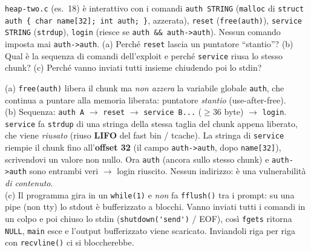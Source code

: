 \question[7]
\lstinline|heap-two.c| (es.\ 18) è interattivo con i comandi \lstinline|auth STRING| (\lstinline|malloc| di \lstinline|struct auth { char name[32]; int auth; }|, azzerata), \lstinline|reset| (\lstinline|free(auth)|), \lstinline|service STRING| (\lstinline|strdup|), \lstinline|login| (riesce se \lstinline|auth && auth->auth|). Nessun comando imposta mai \lstinline|auth->auth|.
(a) Perché \lstinline|reset| lascia un puntatore ``stantio''? (b) Qual è la sequenza di comandi dell'exploit e perché \lstinline|service| riusa lo stesso chunk? (c) Perché vanno inviati tutti insieme chiudendo poi lo stdin?
\begin{solution}
(a) \lstinline|free(auth)| libera il chunk ma \emph{non azzera} la variabile globale \lstinline|auth|, che continua a puntare alla memoria liberata: puntatore \emph{stantio} (use-after-free).\\
(b) Sequenza: \lstinline|auth A| $\to$ \lstinline|reset| $\to$ \lstinline|service B...| ($\ge 36$ byte) $\to$ \lstinline|login|. \lstinline|service| fa \lstinline|strdup| di una stringa della stessa taglia del chunk appena liberato, che viene \emph{riusato} (riuso \textbf{LIFO} del fast bin / tcache). La stringa di \lstinline|service| riempie il chunk fino all'\textbf{offset 32} (il campo \lstinline|auth->auth|, dopo \lstinline|name[32]|), scrivendovi un valore non nullo. Ora \lstinline|auth| (ancora sullo stesso chunk) e \lstinline|auth->auth| sono entrambi veri $\to$ login riuscito. Nessun indirizzo: è una vulnerabilità \emph{di contenuto}.\\
(c) Il programma gira in un \lstinline|while(1)| e \emph{non} fa \lstinline|fflush()| tra i prompt: su una pipe (non tty) lo stdout è bufferizzato a blocchi. Vanno inviati tutti i comandi in un colpo e poi chiuso lo stdin (\lstinline|shutdown('send')| / EOF), così \lstinline|fgets| ritorna \lstinline|NULL|, \lstinline|main| esce e l'output bufferizzato viene scaricato. Inviandoli riga per riga con \lstinline|recvline()| ci si bloccherebbe.
\end{solution}
